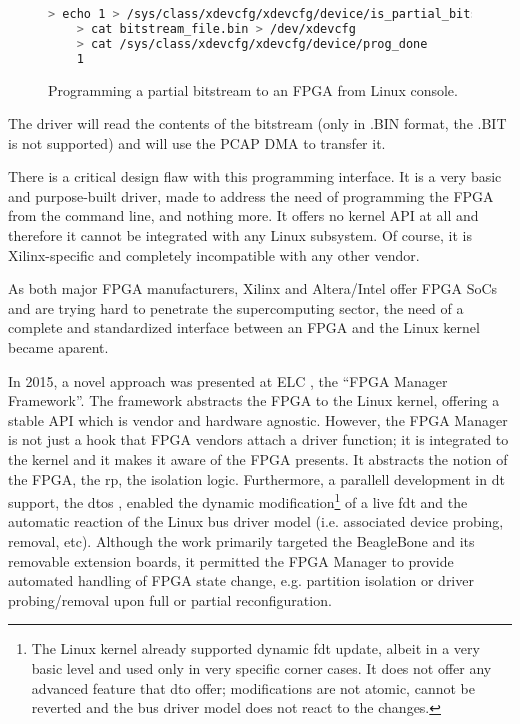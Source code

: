 \begin{figure}[H]
\begin{lstlisting}[style=basic,language=bash]
	> echo 1 > /sys/class/xdevcfg/xdevcfg/device/is_partial_bitstream
	> cat bitstream_file.bin > /dev/xdevcfg
	> cat /sys/class/xdevcfg/xdevcfg/device/prog_done
	1
\end{lstlisting}
\caption{Programming a partial bitstream to an FPGA from Linux console.}
\label{lst:pr-under-linux}
\end{figure}

The driver will read the contents of the bitstream (only in .BIN format, the .BIT is not supported) and
will use the PCAP DMA to transfer it.

There is a critical design flaw with this programming interface. It is a very basic and purpose-built driver, 
made to address the need of programming the FPGA from the command line, and nothing more.
It offers no kernel API at all and therefore it cannot be integrated with any Linux subsystem.
Of course, it is Xilinx-specific and completely incompatible with any other vendor.

As both major FPGA manufacturers, Xilinx and Altera/Intel offer FPGA SoCs and are trying hard to penetrate
the supercomputing sector, the need of a complete and standardized interface between an FPGA and the Linux kernel
became aparent. 

In 2015, a novel approach was presented at ELC \cite{fpgamanager}, the ``FPGA Manager Framework''.
The framework abstracts the FPGA to the Linux kernel, offering a stable API which is vendor and hardware agnostic.
However, the FPGA Manager is not just a hook that FPGA vendors attach a driver function; it is integrated to the kernel
and it makes it aware of the FPGA presents. It abstracts the notion of the FPGA, the \gls{rp}, the isolation logic.
Furthermore, a parallell development in \gls{dt} support, the \glspl{dto} \cite{dto}, enabled the dynamic modification\footnote{
	The Linux kernel already supported dynamic \gls{fdt} update, albeit in a very basic level and used only 
	in very specific corner cases. It does not offer any advanced feature that \gls{dto} offer; modifications are not atomic,
	cannot be reverted and the bus driver model does not react to the changes.
}
of a live \gls{fdt} and the automatic reaction of the Linux bus driver model (i.e. associated device probing, removal, etc).
Although the work primarily targeted the BeagleBone and its removable extension boards, it permitted the FPGA Manager
to provide automated handling of FPGA state change, e.g. partition isolation or driver probing/removal 
upon full or partial reconfiguration.

